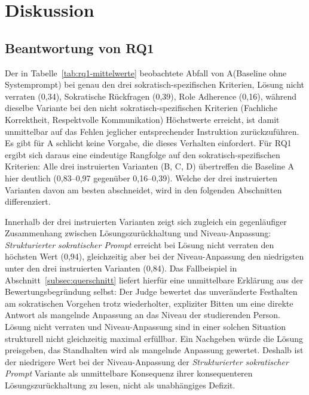 \section{Diskussion}
\label{sec:diskussion}

\subsection{Beantwortung von RQ1}
\label{subsec:rq1-beantwortung}

Der in Tabelle~\ref{tab:rq1-mittelwerte} beobachtete Abfall von A(Baseline ohne Systemprompt) bei genau den drei
sokratisch-spezifischen Kriterien, Lösung nicht verraten (0,34), Sokratische Rückfragen (0,39),
Role Adherence (0,16), während dieselbe Variante bei den nicht sokratisch-spezifischen Kriterien
(Fachliche Korrektheit, Respektvolle Kommunikation) Höchstwerte erreicht, ist damit unmittelbar auf
das Fehlen jeglicher entsprechender Instruktion zurückzuführen. Es gibt für A schlicht keine
Vorgabe, die dieses Verhalten einfordert. Für RQ1 ergibt sich daraus eine eindeutige Rangfolge auf
den sokratisch-spezifischen Kriterien: Alle drei instruierten Varianten (B, C, D) übertreffen die
Baseline A hier deutlich (0,83--0,97 gegenüber 0,16--0,39). Welche der drei instruierten Varianten
davon am besten abschneidet, wird in den folgenden Abschnitten differenziert.

Innerhalb der drei instruierten Varianten zeigt sich zugleich ein gegenläufiger Zusammenhang
zwischen Lösungszurückhaltung und Niveau-Anpassung: \emph{Strukturierter sokratischer Prompt}
erreicht bei \glqq Lösung nicht verraten\grqq{} den höchsten Wert (0,94), gleichzeitig aber bei der
Niveau-Anpassung den niedrigsten unter den drei instruierten Varianten (0,84). Das Fallbeispiel in
Abschnitt~\ref{subsec:querschnitt} liefert hierfür eine unmittelbare Erklärung aus der
Bewertungsbegründung selbst: Der Judge bewertet das unveränderte Festhalten am sokratischen
Vorgehen trotz wiederholter, expliziter Bitten um eine direkte Antwort als mangelnde Anpassung an
das Niveau der studierenden Person. \glqq Lösung nicht verraten\grqq{} und \glqq
Niveau-Anpassung\grqq{} sind in einer solchen Situation strukturell nicht gleichzeitig maximal erfüllbar. Ein Nachgeben würde die Lösung preisgeben, das Standhalten wird als mangelnde Anpassung gewertet. Deshalb ist der niedrigere Wert bei der Niveau-Anpassung der \emph{Strukturierter sokratischer Prompt}
Variante als unmittelbare Konsequenz ihrer konsequenteren Lösungszurückhaltung zu lesen, nicht als
unabhängiges Defizit.

